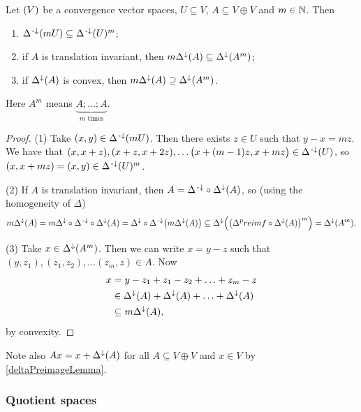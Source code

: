 \begin{lemma} \label{vectorDeltaLemma}
Let $\sSet{V}$ be a convergence vector spaces, $U\subseteq V$, $A\subseteq V\oplus V$ and $m\in \mathbb{N}$. Then
\begin{enumerate}
\item $\Delta^{\text{\hspace{0.15em}-}\downarrow}(mU) \subseteq \Delta^{\text{\hspace{0.15em}-}\downarrow}(U)^m$;
\item if $A$ is translation invariant, then $m\Delta^{\downarrow}(A) \subseteq \Delta^{\downarrow}(A^m)$;
\item if $\Delta^{\downarrow}(A)$ is convex, then $m\Delta^{\downarrow}(A) \supseteq \Delta^{\downarrow}(A^m)$.
\end{enumerate}
Here $A^m$ means $\underbrace{A;\ldots;A}_{\text{$m$ times}}$.
\end{lemma}
\begin{proof}
(1) Take $(x,y)\in \Delta^{\text{\hspace{0.15em}-}\downarrow}(mU)$. Then there exists $z\in U$ such that $y-x = mz$. We have that $(x,x+z), (x+z, x+2z), \ldots \big(x+(m-1)z, x+mz\big)\in \Delta^{\text{\hspace{0.15em}-}\downarrow}(U)$, so $(x,x+mz) = (x,y) \in \Delta^{\text{\hspace{0.15em}-}\downarrow}(U)^m$.


(2) If $A$ is translation invariant, then $A = \Delta^{\text{\hspace{0.15em}-}\downarrow}\circ\Delta^\downarrow(A)$, so (using the homogeneity of $\Delta$)
\[ m\Delta^{\downarrow}(A) = m\Delta^\downarrow\circ \Delta^{\text{\hspace{0.15em}-}\downarrow}\circ\Delta^\downarrow(A) = \Delta^\downarrow\circ \Delta^{\text{\hspace{0.15em}-}\downarrow}\big(m\Delta^\downarrow(A)\big) \subseteq \Delta^{\downarrow}\Big(\big(\Delta^preimf\circ\Delta^\downarrow(A)\big)^m\Big) = \Delta^\downarrow(A^m).  \]

(3) Take $x\in \Delta^{\downarrow}(A^m)$. Then we can write $x= y-z$ such that $(y,z_1), (z_1,z_2), \ldots (z_m, z)\in A$. Now
\begin{align*}
x &= y - z_1 + z_1 - z_2 + \ldots + z_m - z \\
&\in \Delta^{\downarrow}(A) + \Delta^{\downarrow}(A) + \ldots + \Delta^{\downarrow}(A) \\
&\subseteq m\Delta^{\downarrow}(A),
\end{align*}
by convexity.
\end{proof}

Note also $Ax = x + \Delta^\downarrow(A)$ for all $A\subseteq V\oplus V$ and $x\in V$ by \ref{deltaPreimageLemma}.

\subsubsection{Quotient spaces}

